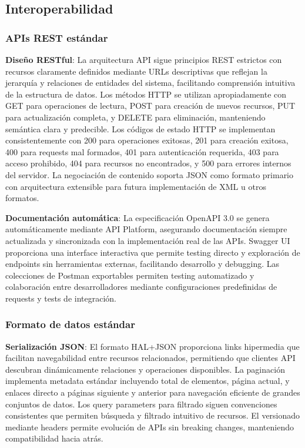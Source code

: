 \documentclass[12pt,a4paper,oneside]{report}
\begin{document}
\subsection{Interoperabilidad}\label{interoperabilidad}

\subsubsection{APIs REST estándar}\label{apis-rest-estuxe1ndar}

\textbf{Diseño RESTful}: La arquitectura API sigue principios REST estrictos con recursos claramente definidos mediante URLs descriptivas que reflejan la jerarquía y relaciones de entidades del sistema, facilitando comprensión intuitiva de la estructura de datos. Los métodos HTTP se utilizan apropiadamente con GET para operaciones de lectura, POST para creación de nuevos recursos, PUT para actualización completa, y DELETE para eliminación, manteniendo semántica clara y predecible. Los códigos de estado HTTP se implementan consistentemente con 200 para operaciones exitosas, 201 para creación exitosa, 400 para requests mal formados, 401 para autenticación requerida, 403 para acceso prohibido, 404 para recursos no encontrados, y 500 para errores internos del servidor. La negociación de contenido soporta JSON como formato primario con arquitectura extensible para futura implementación de XML u otros formatos.

\textbf{Documentación automática}: La especificación OpenAPI 3.0 se genera automáticamente mediante API Platform, asegurando documentación siempre actualizada y sincronizada con la implementación real de las APIs. Swagger UI proporciona una interface interactiva que permite testing directo y exploración de endpoints sin herramientas externas, facilitando desarrollo y debugging. Las colecciones de Postman exportables permiten testing automatizado y colaboración entre desarrolladores mediante configuraciones predefinidas de requests y tests de integración.

\subsubsection{Formato de datos
estándar}\label{formato-de-datos-estuxe1ndar}

\textbf{Serialización JSON}: El formato HAL+JSON proporciona links hipermedia que facilitan navegabilidad entre recursos relacionados, permitiendo que clientes API descubran dinámicamente relaciones y operaciones disponibles. La paginación implementa metadata estándar incluyendo total de elementos, página actual, y enlaces directo a páginas siguiente y anterior para navegación eficiente de grandes conjuntos de datos. Los query parameters para filtrado siguen convenciones consistentes que permiten búsqueda y filtrado intuitivo de recursos. El versionado mediante headers permite evolución de APIs sin breaking changes, manteniendo compatibilidad hacia atrás.
\end{document}
